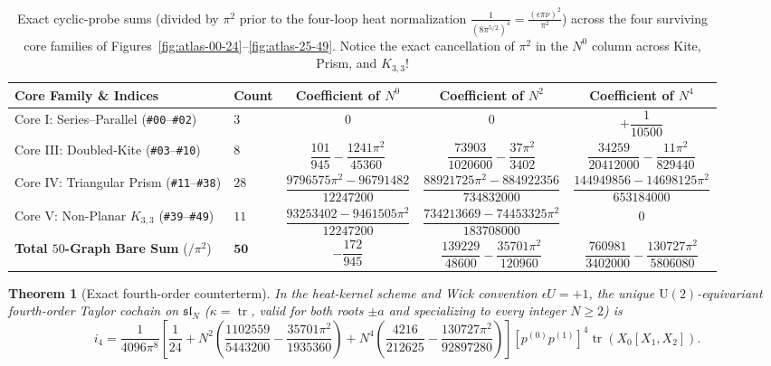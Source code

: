 \documentclass[11pt,letterpaper]{article}
\numberwithin{equation}{section}
\theoremstyle{plain}
\newtheorem{theorem}{Theorem}[section]
\theoremstyle{definition}
\theoremstyle{remark}
\newcommand{\fsl}{\mathfrak{sl}}
\newcommand{\tr}{\operatorname{tr}}
\begin{document}


\begin{table}[H]
\centering
\scriptsize
\setlength{\tabcolsep}{4.8pt}
\renewcommand{\arraystretch}{1.48}
\begin{tabular}{@{}llccc@{}}
\toprule
\textbf{Core Family \& Indices} & \textbf{Count} & \textbf{Coefficient of $N^0$} & \textbf{Coefficient of $N^2$} & \textbf{Coefficient of $N^4$} \\
\midrule
Core I: Series--Parallel (\texttt{\#00}--\texttt{\#02}) & $3$ & $0$ & $0$ & $+\dfrac{1}{10500}$ \\[4.5pt]
Core III: Doubled-Kite (\texttt{\#03}--\texttt{\#10}) & $8$ & $\dfrac{101}{945} - \dfrac{1241\pi^2}{45360}$ & $\dfrac{73903}{1020600} - \dfrac{37\pi^2}{3402}$ & $\dfrac{34259}{20412000} - \dfrac{11\pi^2}{829440}$ \\[4.5pt]
Core IV: Triangular Prism (\texttt{\#11}--\texttt{\#38}) & $28$ & $\dfrac{9796575\pi^2 - 96791482}{12247200}$ & $\dfrac{88921725\pi^2 - 884922356}{734832000}$ & $\dfrac{144949856 - 14698125\pi^2}{653184000}$ \\[4.5pt]
Core V: Non-Planar $K_{3,3}$ (\texttt{\#39}--\texttt{\#49}) & $11$ & $\dfrac{93253402 - 9461505\pi^2}{12247200}$ & $\dfrac{734213669 - 74453325\pi^2}{183708000}$ & $0$ \\
\midrule
\textbf{Total $50$-Graph Bare Sum} ($/\pi^2$) & $\mathbf{50}$ & $-\dfrac{172}{945}$ & $\dfrac{139229}{48600} - \dfrac{35701\pi^2}{120960}$ & $\dfrac{760981}{3402000} - \dfrac{130727\pi^2}{5806080}$ \\
\bottomrule
\end{tabular}
\caption{Exact cyclic-probe sums (divided by $\pi^2$ prior to the four-loop heat normalization $\frac{1}{(8\pi^{5/2})^4} = \frac{(\epsilon\pi\nu)^2}{\pi^2}$) across the four surviving core families of Figures~\ref{fig:atlas-00-24}--\ref{fig:atlas-25-49}. Notice the exact cancellation of $\pi^2$ in the $N^0$ column across Kite, Prism, and $K_{3,3}$!}
\label{tab:fourloop-core-sums}
\end{table}

\begin{theorem}[Exact fourth-order counterterm]
\label{thm:i4}
In the heat-kernel scheme and Wick convention $\epsilon U = +1$, the unique $\mathrm{U}(2)$-equivariant fourth-order Taylor cochain on $\fsl_N$ ($\kappa = \tr$, valid for both roots $\pm a$ and specializing to every integer $N \ge 2$) is
\begin{equation}
\label{eq:i4-closed}
i_4 = \frac{1}{4096\pi^8}\left[\frac{1}{24} + N^2\left(\frac{1102559}{5443200} - \frac{35701\pi^2}{1935360}\right) + N^4\left(\frac{4216}{212625} - \frac{130727\pi^2}{92897280}\right)\right][p^{(0)}p^{(1)}]^4\tr(X_0[X_1,X_2]).
\end{equation}
\end{theorem}
\end{document}
